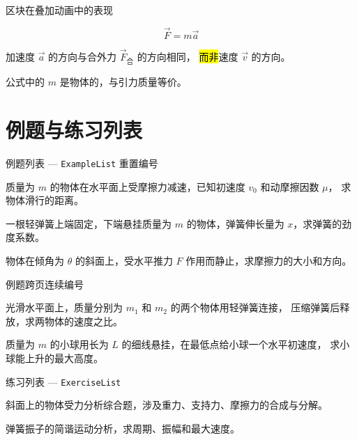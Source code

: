 \documentclass[darkmode=false, randomquote=true, quoteseed=2026, shownav=false,handout=false]{HiBeamer}
\begin{document}
\begin{frame}{区块在叠加动画中的表现}
  \begin{thm}[牛顿第二定律]
    \[ \vec{F} = m \vec{a} \]
  \end{thm}
\vfil
  \pause

  \begin{imp}
    加速度 $\vec{a}$ 的方向与合外力 $\vec{F}_{\text{合}}$ 的方向相同，
    \hl{而非}速度 $\vec{v}$ 的方向。
  \end{imp}
\vfil
  \pause

  \begin{warn}
    公式中的 $m$ 是物体的，与引力质量等价。
  \end{warn}
\end{frame}

\section{例题与练习列表}

\begin{frame}{例题列表 --- \texttt{ExampleList} 重置编号}
  \begin{ExampleList}[0]
    \item 质量为 $m$ 的物体在水平面上受摩擦力减速，已知初速度 $v_0$ 和动摩擦因数 $\mu$，
          求物体滑行的距离。
    \item 一根轻弹簧上端固定，下端悬挂质量为 $m$ 的物体，弹簧伸长量为 $x$，求弹簧的劲度系数。
    \item 物体在倾角为 $\theta$ 的斜面上，受水平推力 $F$ 作用而静止，求摩擦力的大小和方向。
  \end{ExampleList}
\end{frame}

\begin{frame}{例题跨页连续编号}
  \begin{ExampleList}
    \item 光滑水平面上，质量分别为 $m_1$ 和 $m_2$ 的两个物体用轻弹簧连接，
          压缩弹簧后释放，求两物体的速度之比。
    \item 质量为 $m$ 的小球用长为 $L$ 的细线悬挂，在最低点给小球一个水平初速度，
          求小球能上升的最大高度。
  \end{ExampleList}
\end{frame}

\begin{frame}{练习列表 --- \texttt{ExerciseList}}
  \begin{ExerciseList}[0]
    \item 斜面上的物体受力分析综合题，涉及重力、支持力、摩擦力的合成与分解。
    \item 弹簧振子的简谐运动分析，求周期、振幅和最大速度。
  \end{ExerciseList}
\end{frame}
\end{document}
